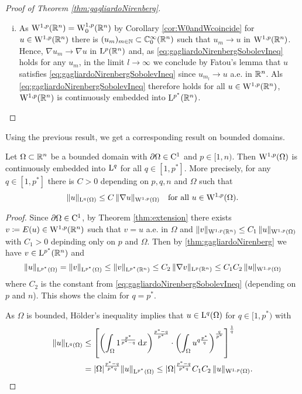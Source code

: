 \begin{proof}[Proof of Theorem \ref{thm:gagliardoNirenberg}]
\begin{enumerate}[i)]
    \item As $\mathrm{W}^{1,p}(\mathbb{R}^n) = \mathrm{W}_0^{1,p}(\mathbb{R}^n)$ by Corollary \ref{cor:W0andWcoincide} for $u \in \mathrm{W}^{1,p}(\mathbb{R}^n)$ there is $(u_m)_{m \in \mathbb{N}} \subset \mathbb{C}_0^\infty(\mathbb{R}^n)$ such that $u_m \to u$ in $\mathrm{W}^{1,p}(\mathbb{R}^n)$.
      Hence, $\nabla u_m \to \nabla u$ in $\mathrm{L}^p(\mathbb{R}^n)$ and, as \eqref{eq:gagliardoNirenbergSobolevIneq} holds for any $u_m$, in the limit $l \to \infty$ we conclude by Fatou's lemma that $u$ satisfies \eqref{eq:gagliardoNirenbergSobolevIneq} since $u_{m_l} \to u$ a.e. in $\mathbb{R}^n$.
      Als \eqref{eq:gagliardoNirenbergSobolevIneq} therefore holds for all $u \in \mathrm{W}^{1,p}(\mathbb{R}^n)$, $\mathrm{W}^{1,p}(\mathbb{R}^n)$ is continuously embedded into $\mathrm{L}^{p^*}(\mathbb{R}^n)$. \qedhere
  \end{enumerate}
\end{proof}

Using the previous result, we get a corresponding result on bounded domains.

\begin{thm}
  Let $\Omega \subset \mathbb{R}^n$ be a bounded domain with $\partial\Omega \in \mathrm{C}^1$ and $p \in [1,n)$.
    Then $\mathrm{W}^{1,p}(\Omega)$ is continuously embedded into $\mathrm{L}^q$ for all $q \in [1,p^*]$.
    More precisely, for any $q \in [1,p^*]$ there is $C > 0$ depending on $p,q,n$ and $\Omega$ such that
    \begin{equation}
      \|u\|_{\mathrm{L}^q(\Omega)} \leq C \, \|\nabla u\|_{\mathrm{W}^{1,p}(\Omega)} \quad\text{for all } u \in \mathrm{W}^{1,p}(\Omega).
    \end{equation}
\end{thm}

\begin{proof}
  Since $\partial \Omega \in \mathrm{C}^1$, by Theorem \ref{thm:extension} there exists $v \coloneqq E(u) \in \mathrm{W}^{1,p}(\mathbb{R}^n)$ such that $v = u$ a.e. in $\Omega$ and $\|v\|_{\mathrm{W}^{1,p}(\mathbb{R}^n)} \leq C_1 \, \|u\|_{\mathrm{W}^{1,p}(\Omega)}$ with $C_1 > 0$ depinding only on $p$ and $\Omega$.
  Then by \ref{thm:gagliardoNirenberg} we have $v \in \mathrm{L}^{p^*}(\mathbb{R}^n)$ and
  $$
  \| u\|_{\mathrm{L}^{p^*}(\Omega)} = \|v\|_{\mathrm{L}^{p^*}(\Omega)} \leq \|v\|_{\mathrm{L}^{p^*}(\mathbb{R}^n)} \leq C_2 \, \|\nabla v\|_{\mathrm{L}^p(\mathbb{R}^n)} \leq C_1 C_2 \, \|u\|_{\mathrm{W}^{1,p}(\Omega)}
  $$
  where $C_2$ is the constant from \eqref{eq:gagliardoNirenbergSobolevIneq} (depending on $p$ and $n$).
  This shows the claim for $q = p^*$.

  As $\Omega$ is bounded, Hölder's inequality implies that $u \in \mathrm{L}^q(\Omega)$ for $q \in [1,p^*)$ with
  \begin{align}
    \label{eq:embeddingpltn}
    \|u\|_{\mathrm{L}^q(\Omega)}
    & \leq \left[ \left( \int_\Omega 1^{\frac{p^*}{p^* - q}} \, {\operatorname{d}\!{x}} \right)^{\frac{p^* - q}{p^*}} \cdot \left( \int_\Omega u^{q  \frac{p^*}{q}} \right)^{\frac{q}{p^*}} \right]^{\frac{1}{q}} \\
    &= |\Omega|^{\frac{p^* - q}{p^* q}} \|u\|_{\mathrm{L}^{p^*}(\Omega)}
    \leq |\Omega|^{\frac{p^* - q}{p^* q}} C_1 C_2 \, \|u\|_{\mathrm{W}^{1,p}(\Omega)} \nonumber. \qedhere
  \end{align}
\end{proof}

